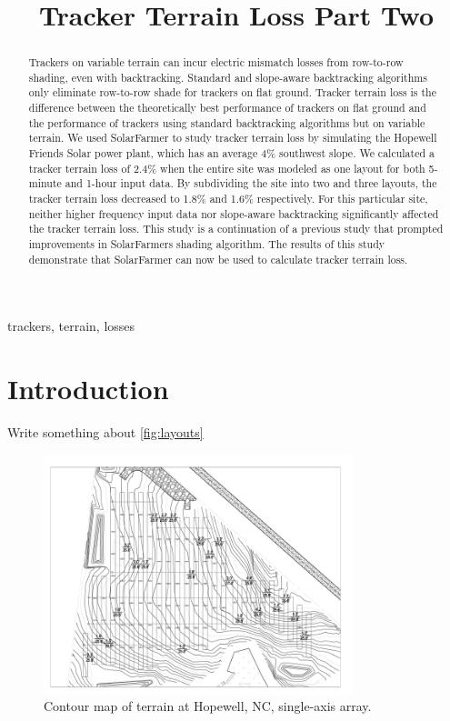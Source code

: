 \documentclass[conference]{IEEEtran}
\begin{document}
\title{Tracker Terrain Loss Part Two}

\author{
	}

\maketitle

\begin{abstract}
Trackers on variable terrain can incur electric mismatch losses from row-to-row shading, even with backtracking. Standard and slope-aware backtracking algorithms only eliminate row-to-row shade for trackers on flat ground. Tracker terrain loss is the difference between the theoretically best performance of trackers on flat ground and the performance of trackers using standard backtracking algorithms but on variable terrain. We used SolarFarmer to study tracker terrain loss by simulating the Hopewell Friends Solar power plant, which has an average 4\% southwest slope. We calculated a tracker terrain loss of 2.4\% when the entire site was modeled as one layout for both 5-minute and 1-hour input data. By subdividing the site into two and three layouts, the tracker terrain loss decreased to 1.8\% and 1.6\% respectively. For this particular site, neither higher frequency input data nor slope-aware backtracking significantly affected the tracker terrain loss. This study is a continuation of a previous study that prompted improvements in SolarFarmers shading algorithm. The results of this study demonstrate that SolarFarmer can now be used to calculate tracker terrain loss.
\end{abstract}

\begin{IEEEkeywords}
trackers, terrain, losses
\end{IEEEkeywords}

\section{Introduction}
Write something about \ref{fig:layouts}

\begin{figure}[htbp]
\centerline{\includegraphics[width=9cm]{Hopewell_Civil_Base.png}}
\caption{Contour map of terrain at Hopewell, NC, single-axis array.}
\label{fig:hopewell_contour_map}
\end{figure}
\end{document}
